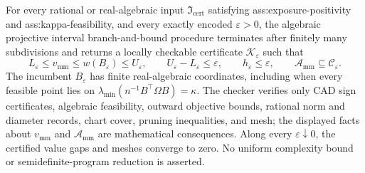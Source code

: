 For every rational or real-algebraic input \(\mathfrak I_{\mathrm{cert}}\) satisfying ass:exposure-positivity and ass:kappa-feasibility, and every exactly encoded \(\varepsilon>0\), the algebraic projective interval branch-and-bound procedure terminates after finitely many subdivisions and returns a locally checkable certificate \(\mathscr K_{\varepsilon}\) such that
\[
 L_{\varepsilon}\le v_{\mathrm{mm}}\le w(B_{\varepsilon})\le U_{\varepsilon},
 \qquad U_{\varepsilon}-L_{\varepsilon}\le\varepsilon,
 \qquad h_{\varepsilon}\le\varepsilon,
 \qquad \mathcal A_{\mathrm{mm}}\subseteq\mathcal C_{\varepsilon}.
\]
The incumbent \(B_{\varepsilon}\) has finite real-algebraic coordinates, including when every feasible point lies on \(\lambda_{\min}(n^{-1}B^{\top}\Omega B)=\kappa\).  The checker verifies only CAD sign certificates, algebraic feasibility, outward objective bounds, rational norm and diameter records, chart cover, pruning inequalities, and mesh; the displayed facts about \(v_{\mathrm{mm}}\) and \(\mathcal A_{\mathrm{mm}}\) are mathematical consequences.  Along every \(\varepsilon\downarrow0\), the certified value gaps and meshes converge to zero.  No uniform complexity bound or semidefinite-program reduction is asserted.